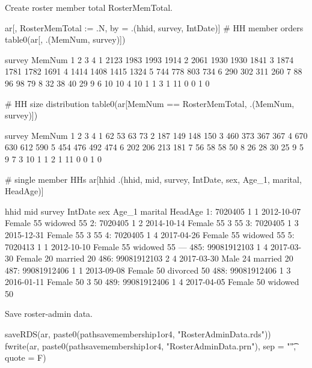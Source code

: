 Create roster member total \textsf{RosterMemTotal}. 
\begin{Schunk}
\begin{Sinput}
ar[, RosterMemTotal := .N, by = .(hhid, survey, IntDate)]
# HH member orders
table0(ar[, .(MemNum, survey)])
\end{Sinput}
\begin{Soutput}
      survey
MemNum    1    2    3    4
    1  2123 1983 1993 1914
    2  2061 1930 1930 1841
    3  1874 1781 1782 1691
    4  1414 1408 1415 1324
    5   744  778  803  734
    6   290  302  311  260
    7    88   96   98   79
    8    32   38   40   29
    9     6   10   10    4
    10    1    1    3    1
    11    0    0    1    0
\end{Soutput}
\begin{Sinput}
# HH size distribution
table0(ar[MemNum == RosterMemTotal, .(MemNum, survey)])
\end{Sinput}
\begin{Soutput}
      survey
MemNum   1   2   3   4
    1   62  53  63  73
    2  187 149 148 150
    3  460 373 367 367
    4  670 630 612 590
    5  454 476 492 474
    6  202 206 213 181
    7   56  58  58  50
    8   26  28  30  25
    9    5   9   7   3
    10   1   1   2   1
    11   0   0   1   0
\end{Soutput}
\begin{Sinput}
# single member HHs
ar[hhid %in% hhid[RosterMemTotal == 1], 
  .(hhid, mid, survey, IntDate, sex, Age_1, marital, HeadAge)]
\end{Sinput}
\begin{Soutput}
            hhid mid survey    IntDate    sex Age_1  marital HeadAge
  1:     7020405   1      1 2012-10-07 Female    55  widowed      55
  2:     7020405   1      2 2014-10-14 Female    55        3      55
  3:     7020405   1      3 2015-12-31 Female    55        3      55
  4:     7020405   1      4 2017-04-26 Female    55  widowed      55
  5:     7020413   1      1 2012-10-10 Female    55  widowed      55
 ---                                                                
485: 99081912103   1      4 2017-03-30 Female    20  married      20
486: 99081912103   2      4 2017-03-30   Male    24  married      20
487: 99081912406   1      1 2013-09-08 Female    50 divorced      50
488: 99081912406   1      3 2016-01-11 Female    50        3      50
489: 99081912406   1      4 2017-04-05 Female    50  widowed      50
\end{Soutput}
\end{Schunk}
Save roster-admin data.
\begin{Schunk}
\begin{Sinput}
saveRDS(ar, paste0(pathsavemembership1or4, "RosterAdminData.rds"))
fwrite(ar, paste0(pathsavemembership1or4, "RosterAdminData.prn"), sep = "\t", quote = F)
\end{Sinput}
\end{Schunk}


